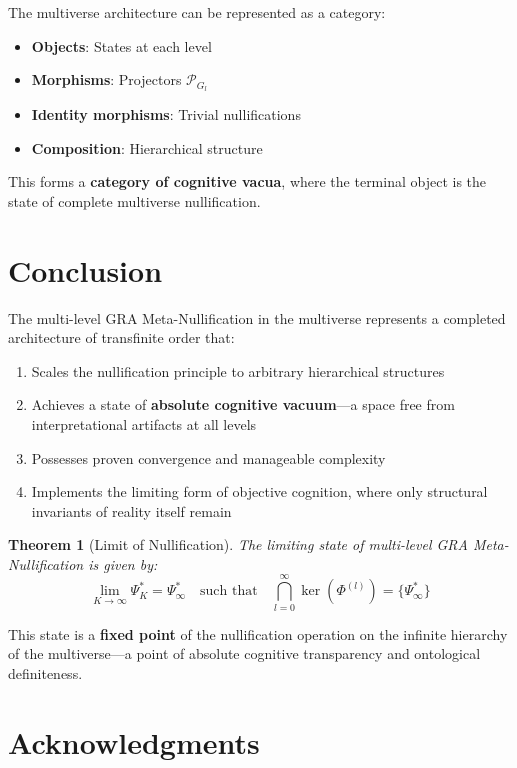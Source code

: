 \documentclass[12pt,a4paper]{article}
\newtheorem{theorem}{Theorem}[section]
\newcommand{\calP}{\mathcal{P}}
\newcommand{\PhiFunc}{\Phi}
\begin{document}
The multiverse architecture can be represented as a category:
\begin{itemize}
    \item \textbf{Objects}: States at each level
    \item \textbf{Morphisms}: Projectors $\calP_{G_l}$
    \item \textbf{Identity morphisms}: Trivial nullifications
    \item \textbf{Composition}: Hierarchical structure
\end{itemize}

This forms a \textbf{category of cognitive vacua}, where the terminal object is the state of complete multiverse nullification.

\section{Conclusion}

The multi-level GRA Meta-Nullification in the multiverse represents a completed architecture of transfinite order that:
\begin{enumerate}
    \item Scales the nullification principle to arbitrary hierarchical structures
    \item Achieves a state of \textbf{absolute cognitive vacuum}---a space free from interpretational artifacts at all levels
    \item Possesses proven convergence and manageable complexity
    \item Implements the limiting form of objective cognition, where only structural invariants of reality itself remain
\end{enumerate}

\begin{theorem}[Limit of Nullification]
The limiting state of multi-level GRA Meta-Nullification is given by:
\begin{equation}
\boxed{
\lim_{K \to \infty} \Psi_K^* = \Psi_{\infty}^* \quad \text{such that} \quad 
\bigcap_{l=0}^{\infty} \ker(\PhiFunc^{(l)}) = \{\Psi_{\infty}^*\}
}
\end{equation}
\end{theorem}

This state is a \textbf{fixed point} of the nullification operation on the infinite hierarchy of the multiverse---a point of absolute cognitive transparency and ontological definiteness.

\section*{Acknowledgments}
\end{document}
